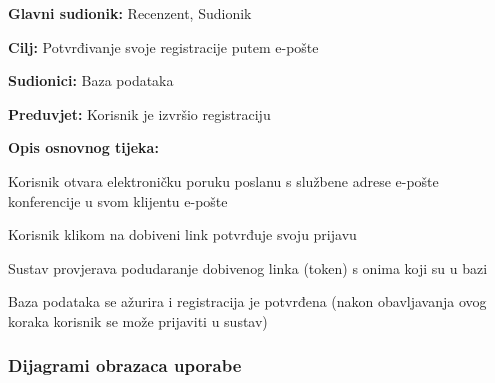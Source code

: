 				\begin{packed_item}
					\item \textbf{Glavni sudionik:} Recenzent, Sudionik
					\item \textbf{Cilj:} Potvrđivanje svoje registracije putem e-pošte
					\item \textbf{Sudionici:} Baza podataka
					\item \textbf{Preduvjet:} Korisnik je izvršio registraciju
					
					\item \textbf{Opis osnovnog tijeka:} 
					\item[] \begin{packed_enum}
						
						\item Korisnik otvara elektroničku poruku poslanu s službene adrese e-pošte konferencije u svom klijentu e-pošte
						\item Korisnik klikom na dobiveni link potvrđuje svoju prijavu
						\item Sustav provjerava podudaranje dobivenog linka (token) s onima koji su u bazi
						\item Baza podataka se ažurira i registracija je potvrđena 
						(nakon obavljavanja ovog koraka korisnik se može prijaviti u sustav)
						
						
					\end{packed_enum}
				\end{packed_item}
					

				\pagebreak

					
					
					
				
					
				\subsubsection{Dijagrami obrazaca uporabe}
					
